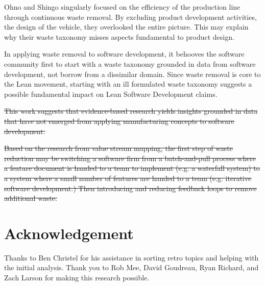 Ohno and Shingo singularly focused on the efficiency of the production line through continuous waste removal. By excluding product development activities, the design of the vehicle, they overlooked the entire picture. This may explain why their waste taxonomy misses aspects fundamental to product design.

In applying waste removal to software development, it behooves the software community first to start with a waste taxonomy grounded in data from software development, not borrow from a dissimilar domain. Since waste removal is core to the Lean movement, starting with an ill formulated waste taxonomy suggests a possible fundamental impact on Lean Software Development claims.

\sout{This work suggests that evidence-based research yields insights grounded in data that have not emerged from applying manufacturing concepts to software development.}

\sout{Based on the research from value stream mapping, the first step of waste reduction may be switching a software firm from a batch-and-pull process where a feature document is handed to a team to implement (e.g. a waterfall system) to a system where a small number of features are handed to a team (e.g. iterative software development.) Then introducing and reducing feedback loops to remove additional waste.}
\section*{Acknowledgement}
Thanks to Ben Christel for his assistance in sorting retro topics and helping with the initial analysis. Thank you to Rob Mee, David Goudreau, Ryan Richard, and Zach Larson for making this research possible.
